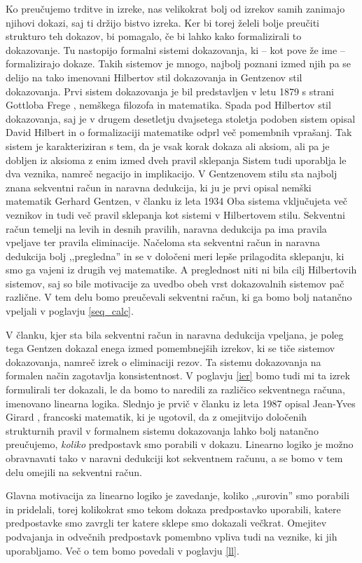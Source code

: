 Ko preučujemo trditve in izreke, nas velikokrat bolj od izrekov samih zanimajo njihovi dokazi, saj ti držijo bistvo izreka. Ker bi torej želeli bolje preučiti strukturo teh dokazov, bi pomagalo, če bi lahko kako formalizirali to dokazovanje. Tu nastopijo formalni sistemi dokazovanja, ki -- kot pove že ime -- formalizirajo dokaze. Takih sistemov je mnogo, najbolj poznani izmed njih pa se delijo na tako imenovani Hilbertov stil dokazovanja in Gentzenov stil dokazovanja. Prvi sistem dokazovanja je bil predstavljen v letu 1879 s strani Gottloba Frege \cite{proof-herstory}, nemškega filozofa in matematika. Spada pod Hilbertov stil dokazovanja, saj je v drugem desetletju dvajsetega stoletja podoben sistem opisal David Hilbert \cite{proof-herstory} in o formalizaciji matematike odprl več pomembnih vprašanj. Tak sistem je karakteriziran s tem, da je vsak korak dokaza ali aksiom, ali pa je dobljen iz aksioma z enim izmed dveh pravil sklepanja Sistem tudi uporablja le dva veznika, namreč negacijo in implikacijo. V Gentzenovem stilu sta najbolj znana sekventni račun in naravna dedukcija, ki ju je prvi opisal nemški matematik Gerhard Gentzen, v članku iz leta 1934 \cite{proof-herstory} Oba sistema vključujeta več veznikov in tudi več pravil sklepanja kot sistemi v Hilbertovem stilu. Sekventni račun temelji na levih in desnih pravilih, naravna dedukcija pa ima pravila vpeljave ter pravila eliminacije. Načeloma sta sekventni račun in naravna dedukcija bolj ,,pregledna'' in se v določeni meri lepše prilagodita sklepanju, ki smo ga vajeni iz drugih vej matematike. A preglednost niti ni bila cilj Hilbertovih sistemov, saj so bile motivacije za uvedbo obeh vrst dokazovalnih sistemov pač različne. V tem delu bomo preučevali sekventni račun, ki ga bomo bolj natančno vpeljali v poglavju \ref{seq_calc}.

V članku, kjer sta bila sekventni račun in naravna dedukcija vpeljana, je poleg tega Gentzen dokazal enega izmed pomembnejših izrekov, ki se tiče sistemov dokazovanja, namreč izrek o eliminaciji rezov. Ta sistemu dokazovanja na formalen način zagotavlja konsistentnost. V poglavju \ref{ier} bomo tudi mi ta izrek formulirali ter dokazali, le da bomo to naredili za različico sekventnega računa, imenovano linearna logika. Slednjo je prvič v članku iz leta 1987 opisal Jean-Yves Girard \cite{ll-herstory}, francoski matematik, ki je ugotovil, da z omejitvijo določenih strukturnih pravil v formalnem sistemu dokazovanja lahko bolj natančno preučujemo, \emph{koliko} predpostavk smo porabili v dokazu. Linearno logiko je možno obravnavati tako v naravni dedukciji kot sekventnem računu, a se bomo v tem delu omejili na sekventni račun.

Glavna motivacija za linearno logiko je zavedanje, koliko ,,surovin'' smo porabili in pridelali, torej kolikokrat smo tekom dokaza predpostavko uporabili, katere predpostavke smo zavrgli ter katere sklepe smo dokazali večkrat. Omejitev podvajanja in odvečnih predpostavk pomembno vpliva tudi na veznike, ki jih uporabljamo. Več o tem bomo povedali v poglavju \ref{ll}.
